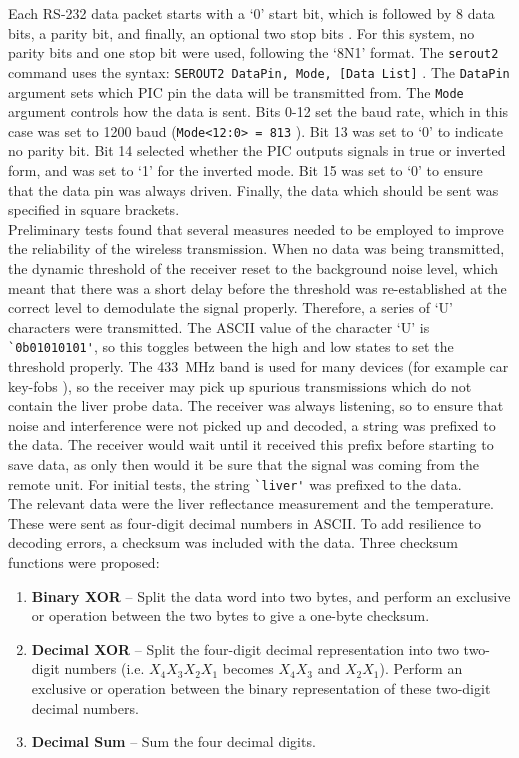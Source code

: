 Each RS-232 data packet starts with a `0' start bit, which is followed by 8 data bits, a parity bit, and finally, an optional two stop bits \cite{rs232}. For this system, no parity bits and one stop bit were used, following the `8N1' format. The \verb|serout2| command uses the syntax: \verb|SEROUT2 DataPin, Mode, [Data List]| \cite{picbasic_pro}. The \verb|DataPin| argument sets which PIC pin the data will be transmitted from. The \verb|Mode| argument controls how the data is sent. Bits 0-12 set the baud rate, which in this case was set to 1200 baud (\verb|Mode<12:0> = 813| \cite{picbasic_pro}). Bit 13 was set to `0' to indicate no parity bit. Bit 14 selected whether the PIC outputs signals in true or inverted form, and was set to `1' for the inverted mode. Bit 15 was set to `0' to ensure that the data pin was always driven. Finally, the data which should be sent was specified in square brackets.\\

Preliminary tests found that several measures needed to be employed to improve the reliability of the wireless transmission. When no data was being transmitted, the dynamic threshold of the receiver reset to the background noise level, which meant that there was a short delay before the threshold was re-established at the correct level to demodulate the signal properly. Therefore, a series of `U' characters were transmitted. The ASCII value of the character `U' is \verb|`0b01010101'|, so this toggles between the high and low states to set the threshold properly. The \SI{433}{\mega\hertz} band is used for many devices (for example car key-fobs \cite{qam-rx}), so the receiver may pick up spurious transmissions which do not contain the liver probe data. The receiver was always listening, so to ensure that noise and interference were not picked up and decoded, a string was prefixed to the data. The receiver would wait until it received this prefix before starting to save data, as only then would it be sure that the signal was coming from the remote unit. For initial tests, the string \verb|`liver'| was prefixed to the data. \\

The relevant data were the liver reflectance measurement and the temperature. These were sent as four-digit decimal numbers in ASCII. To add resilience to decoding errors, a checksum was included with the data. Three checksum functions were proposed:
\begin{enumerate}
\item \label{check: binary xor} \textbf{Binary XOR} -- Split the data word into two bytes, and perform an exclusive or operation between the two bytes to give a one-byte checksum.
\item \label{check: decimal xor} \textbf{Decimal XOR} -- Split the four-digit decimal representation into two two-digit numbers (i.e. $X_4X_3X_2X_1$ becomes $X_4X_3$ and $X_2X_1$). Perform an exclusive or operation between the binary representation of these two-digit decimal numbers.
\item \label{check: decimal sum} \textbf{Decimal Sum} -- Sum the four decimal digits.
\end{enumerate}

